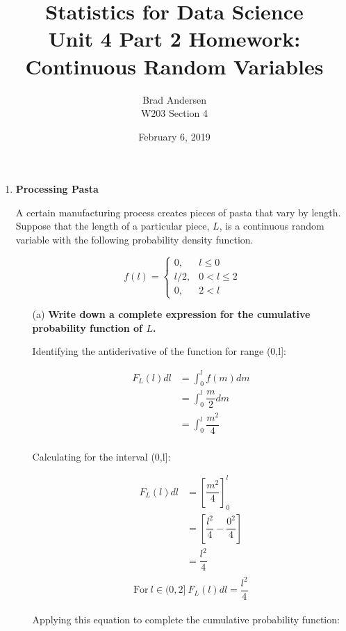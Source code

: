 \documentclass[12pt,a4paper]{article}
\title{Statistics for Data Science \\
    Unit 4 Part 2 Homework: Continuous Random Variables}
\author{Brad Andersen \\
    W203 Section 4}
\date{February 6, 2019}
\numberwithin{equation}{subsection}
\begin{document}
\maketitle

\begin{enumerate}


\item \textbf{Processing Pasta}

A certain manufacturing process creates pieces of pasta that vary by length.  Suppose that the length of a particular piece, $L$, is a continuous random variable with the following probability density function.

$$f(l) = \begin{cases} 0, &l \leq 0 \\
l/2, &0 < l \leq 2 \\ 
0, &2 < l
\end{cases}
$$

\begin{enumerate}
\item[(a)] \textbf{Write down a complete expression for the cumulative probability function of $L$.}

Identifying the antiderivative of the function for range (0,l]:

\begin{equation*}
\begin{split}
F_{L}(l)dl & = \int_0^lf(m)dm \\
& = \int_0^l\dfrac{m}{2}dm \\
& = \int_0^l\dfrac{m^{2}}{4} \\
\end{split}
\end{equation*}

Calculating for the interval (0,l]:

\begin{equation*}
\begin{split}
F_{L}(l)dl & = \left[\dfrac{m^{2}}{4}\right]_0^l \\
& = \left[\dfrac{l^{2}}{4} - \dfrac{0^{2}}{4}\right] \\
& = \dfrac{l^{2}}{4} \\
\end{split}
\end{equation*}
$$\text{For} \:l \in (0,2]\:F_{L}(l)dl = \dfrac{l^{2}}{4}$$ \\

Applying this equation to complete the cumulative probability function:


\end{enumerate}
\end{enumerate}
\end{document}

